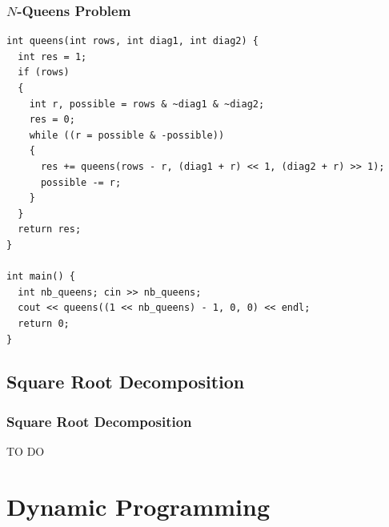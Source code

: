 \documentclass{beamer}
\begin{document}
\begin{frame}[containsverbatim]
\frametitle{$N$-Queens Problem}

\scriptsize
\begin{lstlisting}
int queens(int rows, int diag1, int diag2) {
  int res = 1;
  if (rows)
  {
    int r, possible = rows & ~diag1 & ~diag2;
    res = 0;
    while ((r = possible & -possible))
    {
      res += queens(rows - r, (diag1 + r) << 1, (diag2 + r) >> 1);
      possible -= r;
    }
  }
  return res;
}

int main() {
  int nb_queens; cin >> nb_queens;
  cout << queens((1 << nb_queens) - 1, 0, 0) << endl;
  return 0;
}
\end{lstlisting}

\end{frame}

\subsection{Square Root Decomposition}

\begin{frame}%
\frametitle{Square Root Decomposition}

TO DO

\end{frame}




\section{Dynamic Programming}
\end{document}
